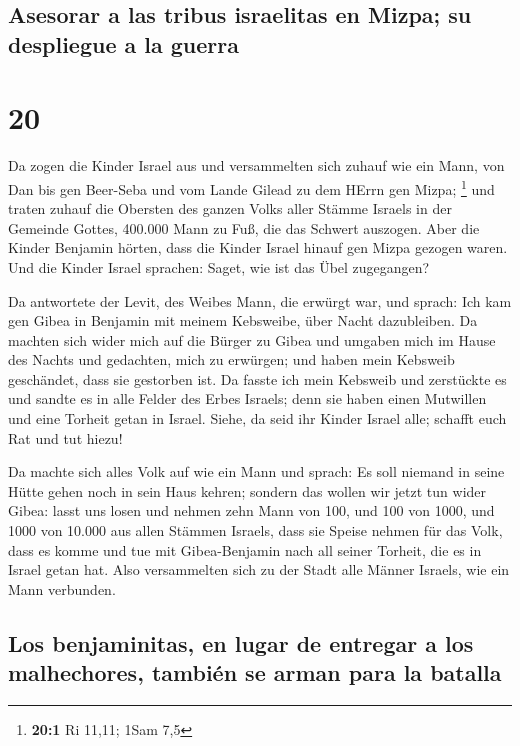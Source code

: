 \hypertarget{asesorar-a-las-tribus-israelitas-en-mizpa-su-despliegue-a-la-guerra}{%
\subsection{Asesorar a las tribus israelitas en Mizpa; su despliegue a
la
guerra}\label{asesorar-a-las-tribus-israelitas-en-mizpa-su-despliegue-a-la-guerra}}

\hypertarget{section-19}{%
\section{20}\label{section-19}}

 Da zogen die Kinder Israel aus und versammelten sich
zuhauf wie ein Mann, von Dan bis gen Beer-Seba und vom Lande Gilead zu
dem HErrn gen Mizpa; \footnote{\textbf{20:1} Ri 11,11; 1Sam 7,5}
 und traten zuhauf die Obersten des ganzen Volks aller
Stämme Israels in der Gemeinde Gottes, 400.000 Mann zu Fuß, die das
Schwert auszogen.  Aber die Kinder Benjamin hörten, dass
die Kinder Israel hinauf gen Mizpa gezogen waren. Und die Kinder Israel
sprachen: Saget, wie ist das Übel zugegangen?

 Da antwortete der Levit, des Weibes Mann, die erwürgt
war, und sprach: Ich kam gen Gibea in Benjamin mit meinem Kebsweibe,
über Nacht dazubleiben.  Da machten sich wider mich auf
die Bürger zu Gibea und umgaben mich im Hause des Nachts und gedachten,
mich zu erwürgen; und haben mein Kebsweib geschändet, dass sie gestorben
ist.  Da fasste ich mein Kebsweib und zerstückte es und
sandte es in alle Felder des Erbes Israels; denn sie haben einen
Mutwillen und eine Torheit getan in Israel.  Siehe, da
seid ihr Kinder Israel alle; schafft euch Rat und tut hiezu!

 Da machte sich alles Volk auf wie ein Mann und sprach: Es
soll niemand in seine Hütte gehen noch in sein Haus kehren;
 sondern das wollen wir jetzt tun wider Gibea:
 lasst uns losen und nehmen zehn Mann von 100, und 100
von 1000, und 1000 von 10.000 aus allen Stämmen Israels, dass sie Speise
nehmen für das Volk, dass es komme und tue mit Gibea-Benjamin nach all
seiner Torheit, die es in Israel getan hat.  Also
versammelten sich zu der Stadt alle Männer Israels, wie ein Mann
verbunden.

\hypertarget{los-benjaminitas-en-lugar-de-entregar-a-los-malhechores-tambiuxe9n-se-arman-para-la-batalla}{%
\subsection{Los benjaminitas, en lugar de entregar a los malhechores,
también se arman para la
batalla}\label{los-benjaminitas-en-lugar-de-entregar-a-los-malhechores-tambiuxe9n-se-arman-para-la-batalla}}

